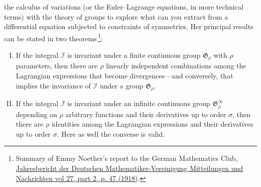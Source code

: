 \documentclass[twoside,symmetric]{tufte-handout}
\begin{document}
\noindent the calculus of variations (or the Euler--Lagrange equations, in more technical terms) with the theory of groups to explore what can you extract from a differential equation subjected to constraints of symmetries. Her principal results can be stated in two theorems$\,$\footnote[][12pt]{Summary of Emmy Noether's report to the German Mathematics Club, \href{http://bit.ly/2BxXXMl}{Jahresbericht der Deutschen Mathematiker-Vereinigung Mitteilungen und Nachrichten vol 27, part 2, p. 47 (1918)}.}:
\begin{enumerate}[I.]
\item If the integral $\mathscr{I}$ is invariant under a finite continuous group $\mathfrak{G}_\rho$ with $\rho$ parameters, then there are $\rho$ linearly independent combinations among the Lagrangian expressions that become divergences---and conversely, that implies the invariance of $\mathscr{I}$ under a group $\mathfrak{G}_\rho$.

\item If the integral $\mathscr{I}$ is invariant under an infinite continuous group $\mathfrak{G}^{\infty}_{\rho}$ depending on $\rho$ arbitrary functions and their derivatives up to order $\sigma$, then there are $\rho$ identities among the Lagrangian expressions and their derivatives up to order $\sigma$. Here as well the converse is valid.
\end{enumerate}
\end{document}
